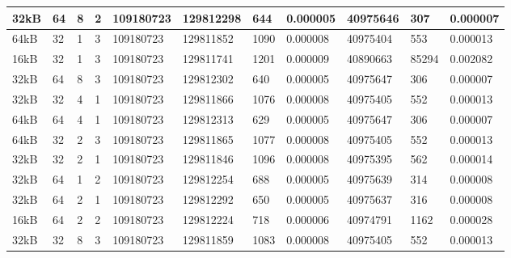 \documentclass[conference]{IEEEtran}
\begin{document}
\begin{table}
\begin{tabular}{|m{.75cm} |m{.75cm} |m{.8cm} | m{.75cm} | l | l | l | l | l | l | l |}
32kB&	64&	8&	2&	109180723&	129812298&	644	&  0.000005&	40975646	&307   &0.000007 \\ \hline
64kB&	32&	1&	3&	109180723&	129811852&	1090&	0.000008	&40975404	  &553   &0.000013 \\ \hline
16kB&	32&	1&	3&	109180723&	129811741&	1201&	0.000009	&40890663	  &85294	&0.002082 \\ \hline
32kB&	64&	8&	3&	109180723&	129812302&	640	&  0.000005&	40975647	&306	  &0.000007 \\ \hline
32kB&	32&	4&	1&	109180723&	129811866&	1076&	0.000008	&40975405	  &552	  &0.000013 \\ \hline
64kB&	64&	4&	1&	109180723&	129812313&	629	&  0.000005&	40975647	&306	  &0.000007 \\ \hline
64kB&	32&	2&	3&	109180723&	129811865&	1077&	0.000008	&40975405	  &552	  &0.000013 \\ \hline
32kB&	32&	2&	1&	109180723&	129811846&	1096&	0.000008	&40975395	  &562	  &0.000014 \\ \hline
32kB&	64&	1&	2&	109180723&	129812254&	688	&  0.000005&	40975639	&314	  &0.000008 \\ \hline
32kB&	64&	2&	1&	109180723&	129812292&	650	&  0.000005&	40975637	&316	  &0.000008 \\ \hline
16kB&	64&	2&	2&	109180723&	129812224&	718	&  0.000006&	40974791&	1162	&0.000028 \\ \hline
32kB&	32&	8&	3&	109180723&	129811859&	1083&	0.000008	&40975405	  &552	  &0.000013 \\ \hline
    \end{tabular}
  \end{table}
\end{document}
